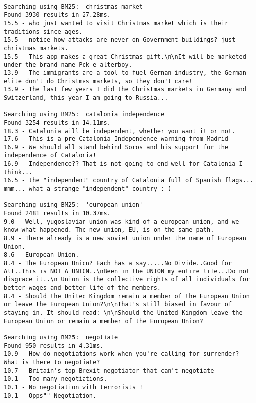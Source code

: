 \documentclass{scrartcl}
\begin{document}
\begin{lstlisting}

Searching using BM25:  christmas market
Found 3930 results in 27.28ms.
15.5 - who just wanted to visit Christmas market which is their traditions since ages.
15.5 - notice how attacks are never on Government buildings? just christmas markets.
15.5 - This app makes a great Christmas gift.\n\nIt will be marketed under the brand name Pok-e-alterboy.
13.9 - The immigrants are a tool to fuel Gernan industry, the German elite don't do Christmas markets, so they don't care!
13.9 - The last few years I did the Christmas markets in Germany and Switzerland, this year I am going to Russia...

Searching using BM25:  catalonia independence
Found 3254 results in 14.11ms.
18.3 - Catalonia will be independent, whether you want it or not.
17.6 - This is a pre Catalonia Independence warning from Madrid
16.9 - We should all stand behind Soros and his support for the independence of Catalonia!
16.9 - Independence?? That is not going to end well for Catalonia I think...
16.5 - the "independent" country of Catalonia full of Spanish flags... mmm... what a strange "independent" country :-)

Searching using BM25:  'european union'
Found 2481 results in 10.37ms.
9.0 - Well, yugoslavian union was kind of a european union, and we know what happened. The new union, EU, is on the same path.
8.9 - There already is a new soviet union under the name of European Union.
8.6 - European Union.
8.4 - The European Union? Each has a say.....No Divide..Good for All..This is NOT A UNION..\nBeen in the UNION my entire life...Do not disgrace it..\n Union is the collective rights of all individuals for better wages and better life of the members.
8.4 - Should the United Kingdom remain a member of the European Union or leave the European Union?\n\nThat's still biased in favour of staying in. It should read:-\n\nShould the United Kingdom leave the European Union or remain a member of the European Union?

Searching using BM25:  negotiate
Found 950 results in 4.31ms.
10.9 - How do negotiations work when you're calling for surrender? What is there to negotiate?
10.7 - Britain's top Brexit negotiator that can't negotiate
10.1 - Too many negotiations.
10.1 - No negotiation with terrorists !
10.1 - Opps"" Negotiation.

\end{lstlisting}
\end{document}
